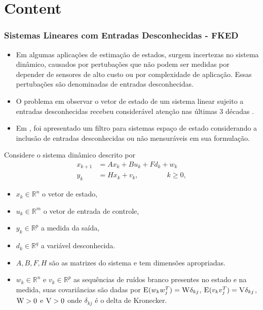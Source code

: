 \section{Content}

\begin{frame}
	\frametitle{Sistemas Lineares com Entradas Desconhecidas - FKED}
	\begin{itemize}
		\item Em algumas aplicações de estimação de estados, surgem incertezas no sistema dinâmico, causados por pertubações que não podem ser medidas por depender de sensores de alto custo ou por complexidade de aplicação. Essas pertubações são denominadas de entradas desconhecidas.
		\item O problema em observar o vetor de estado de um sistema linear sujeito a entradas desconhecidas recebeu considerável atenção nas últimas 3 décadas \cite{Darouach1995, Hou1998, Hsieh2017, Li2018}. 
		\item Em \cite{Darouach1995}, foi apresentado um filtro para sistemas espaço de estado considerando a inclusão de entradas desconhecidas ou não mensuráveis em sua formulação.
	\end{itemize}
\end{frame}

\begin{frame}
	Considere o sistema dinâmico descrito por
	\begin{align}\label{eq:001}
		x_{k+1} &= Ax_{k} + Bu_{k} + Fd_{k} + w_{k}\nonumber \\
		y_{k} &= Hx_{k} + v_{k}, \quad \quad \quad \quad k \geq 0,
	\end{align}
	\begin{itemize}
		\item $x_{k} \in \mathbb{R}^{n}$ o vetor de estado, 
		\item $u_{k} \in \mathbb{R}^{m}$ o vetor de entrada de controle, \item $y_{k} \in \mathbb{R}^{p}$ a medida da saída, 
		\item $d_{k} \in \mathbb{R}^{q}$ a variável desconhecida.
		\item $A, B, F, H$ são as matrizes do sistema e tem dimensões apropriadas. 
		\item $w_{k} \in \mathbb{R}^{n}$ e $v_{k} \in \mathbb{R}^{p}$ as sequências de ruídos branco presentes no estado e na medida, suas covariâncias são dadas por $\textsc{E}(w_{k}w_{j}^{T}) = \textsc{W}\delta_{kj}$, $\textsc{E}(v_{k}v_{j}^{T}) = \textsc{V}\delta_{kj}$, $\textsc{W} > 0$ e $\textsc{V} > 0$ onde $\delta_{kj}$ é o delta de Kronecker.
	\end{itemize}
\end{frame}

